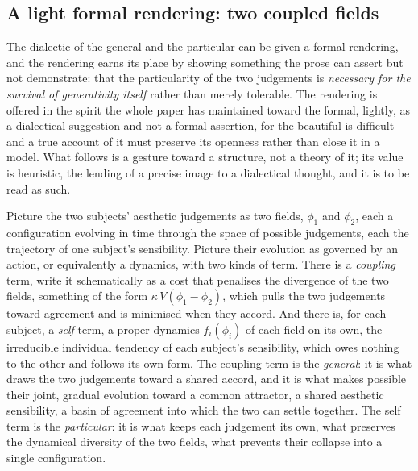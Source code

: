 \subsection{A light formal rendering: two coupled fields}
\label{p21:sub:ev-field}

The dialectic of the general and the particular can be given a formal rendering, and the rendering earns its place by showing something the prose can assert but not demonstrate: that the particularity of the two judgements is \emph{necessary for the survival of generativity itself} rather than merely tolerable. The rendering is offered in the spirit the whole paper has maintained toward the formal, lightly, as a dialectical suggestion and not a formal assertion, for the beautiful is difficult and a true account of it must preserve its openness rather than close it in a model. What follows is a gesture toward a structure, not a theory of it; its value is heuristic, the lending of a precise image to a dialectical thought, and it is to be read as such.

Picture the two subjects' aesthetic judgements as two fields, $\phi_1$ and $\phi_2$, each a configuration evolving in time through the space of possible judgements, each the trajectory of one subject's sensibility. Picture their evolution as governed by an action, or equivalently a dynamics, with two kinds of term. There is a \emph{coupling} term, write it schematically as a cost that penalises the divergence of the two fields, something of the form $\kappa\,V(\phi_1 - \phi_2)$, which pulls the two judgements toward agreement and is minimised when they accord. And there is, for each subject, a \emph{self} term, a proper dynamics $f_i(\phi_i)$ of each field on its own, the irreducible individual tendency of each subject's sensibility, which owes nothing to the other and follows its own form. The coupling term is the \emph{general}: it is what draws the two judgements toward a shared accord, and it is what makes possible their joint, gradual evolution toward a common attractor, a shared aesthetic sensibility, a basin of agreement into which the two can settle together. The self term is the \emph{particular}: it is what keeps each judgement its own, what preserves the dynamical diversity of the two fields, what prevents their collapse into a single configuration.

